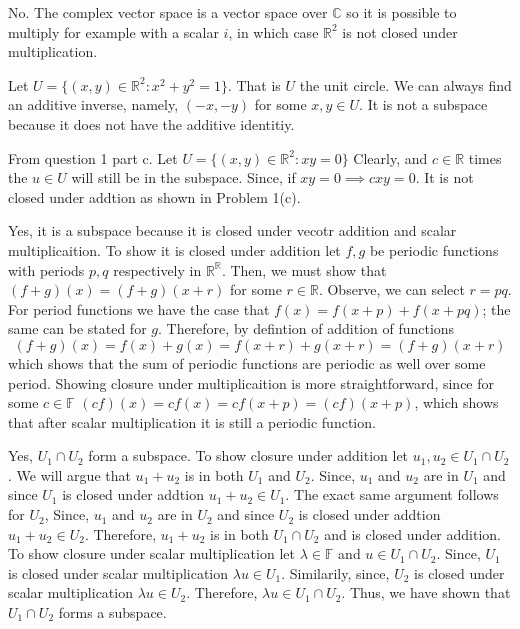 \documentclass[10pt, twocolumn]{article}
\newcommand{\C}{\mathbb{C}}
\newcommand{\R}{\mathbb{R}}
\begin{document}
\begin{q}[Problem 5]
    No. The complex vector space is a vector space over $ \C $ so it is possible to multiply for example with a scalar $ i $, 
    in which case $ \R^2 $ is not closed under multiplication.
\end{q}
\begin{q}[Problem 7]
    Let $ U = \{(x, y) \in \R^2 : x^2 + y^2 = 1\} $. That is $ U $ the unit circle. 
    We can always find an additive inverse, namely, $(-x, -y)$ for some $ x, y \in U $. 
    It is not a subspace because it does not have the additive identitiy.
\end{q}
\begin{q}[Problem 8]
    From question 1 part c. 
    Let $U =\{(x, y) \in \R^2 : xy = 0\} $
    Clearly, and $ c \in \R $ times the $ u \in U $ will still be in the subspace. Since, if $ xy = 0 \implies cxy = 0 $. 
    It is not closed under addtion as shown in Problem 1(c).
\end{q}
\begin{q}[Problem 9]
    Yes, it is a subspace because it is closed under vecotr addition and scalar multiplicaition.
    To show it is closed under addition let $f, g $ be periodic functions with periods $ p, q $ respectively in $ \R^\R $.
    Then, we must show that $ (f + g)(x) = (f+g)(x + r) $ for some $ r \in \R $. 
    Observe, we can select $ r = pq $. 
    For period functions we have the case that 
    $ f(x) = f(x+p) + f(x+pq) $;
    the same can be stated for $ g $. 
    Therefore, by defintion of addition of functions
    $$ (f + g)(x) = f(x) + g(x) = f(x + r) + g(x + r) = (f+g)(x + r) $$
    which shows that the sum of periodic functions are periodic as well over some period. 
    Showing closure under multiplicaition is more straightforward, since for some $ c \in \mathbb{F} $
    $ (cf)(x) = cf(x) = cf(x+p) = (cf)(x+p) $,
    which shows that after scalar multiplication it is still a periodic function. 
\end{q}
\begin{q}[Problem 10]
    Yes, $ U_1 \cap U_2 $ form a subspace. 
    To show closure under addition let $ u_1, u_2 \in U_1 \cap U_2 $. 
    We will argue that $ u_1 + u_2 $ is in both $ U_1 $ and $ U_2 $. 
    Since, $ u_1 $ and $ u_2 $ are in $ U_1 $ and since $ U_1 $ is closed under addtion $ u_1 + u_2 \in U_1 $. 
    The exact same argument follows for $ U_2 $,
    Since, $ u_1 $ and $ u_2 $ are in $ U_2 $ and since $ U_2 $ is closed under addtion $ u_1 + u_2 \in U_2 $. 
    Therefore, $ u_1 + u_2 $ is in both $ U_1 \cap U_2 $ and is closed under addition.  \\
    To show closure under scalar multiplication let $ \lambda \in \mathbb{F} $ and $ u \in U_1 \cap U_2 $. 
    Since, $ U_1 $ is closed under scalar multiplication $ \lambda u \in U_1 $.
    Similarily,  
    since, $ U_2 $ is closed under scalar multiplication $ \lambda u \in U_2 $.
    Therefore, $ \lambda u \in U_1 \cap U_2 $.
    Thus, we have shown that $ U_1 \cap U_2 $ forms a subspace. 
\end{q}
\end{document}
